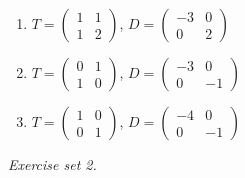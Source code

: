 \begin{enumerate}[label=\arabic*., leftmargin=*, itemsep=1pt]
\item $T=\left(\begin{smallmatrix}1 & 1\\ 1 & 2\end{smallmatrix}\right)$, $D=\left(\begin{smallmatrix}-3 & 0\\ 0 & 2\end{smallmatrix}\right)$
\item $T=\left(\begin{smallmatrix}0 & 1\\ 1 & 0\end{smallmatrix}\right)$, $D=\left(\begin{smallmatrix}-3 & 0\\ 0 & -1\end{smallmatrix}\right)$
\item $T=\left(\begin{smallmatrix}1 & 0\\ 0 & 1\end{smallmatrix}\right)$, $D=\left(\begin{smallmatrix}-4 & 0\\ 0 & -1\end{smallmatrix}\right)$
\end{enumerate}
\par\noindent\emph{Exercise set 2.}\nopagebreak
